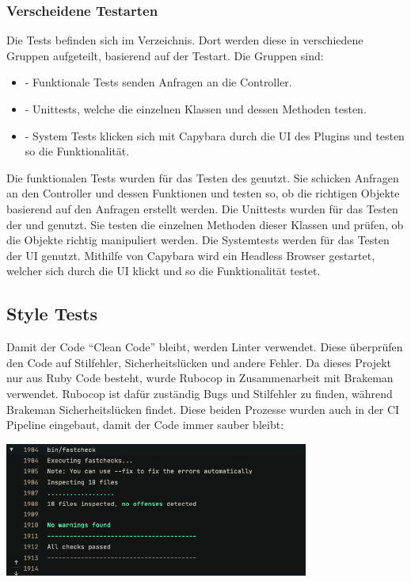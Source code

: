 \subsubsection{Verscheidene Testarten}
Die Tests befinden sich im  Verzeichnis. Dort werden diese in verschiedene
Gruppen aufgeteilt, basierend auf der Testart. Die Gruppen sind:
\begin{itemize}
    \item {} - Funktionale Tests senden Anfragen an die Controller.
    \item {} - Unittests, welche die einzelnen Klassen und dessen Methoden
    testen.
    \item {} - System Tests klicken sich mit Capybara durch die UI des
    Plugins und testen so die Funktionalität.
\end{itemize}
Die funktionalen Tests wurden für das Testen des 
genutzt. Sie schicken Anfragen an den Controller und dessen Funktionen und testen so, ob die richtigen
Objekte basierend auf den Anfragen erstellt werden. \newline
Die Unittests wurden für das Testen der  und 
 genutzt. Sie testen die einzelnen Methoden dieser Klassen und
prüfen, ob die Objekte richtig manipuliert werden. \newline
Die Systemtests werden für das Testen der UI genutzt. Mithilfe von Capybara wird ein Headless Browser
gestartet, welcher sich durch die UI klickt und so die Funktionalität testet.
\subsection{Style Tests}
Damit der Code \enquote{Clean Code} bleibt, werden Linter verwendet. Diese überprüfen den Code auf Stilfehler,
Sicherheitslücken und andere Fehler. \newline
Da dieses Projekt nur aus Ruby Code besteht, wurde Rubocop in Zusammenarbeit mit Brakeman verwendet. Rubocop
ist dafür zuständig Bugs und Stilfehler zu finden, während Brakeman Sicherheitslücken findet. Diese beiden
Prozesse wurden auch in der CI Pipeline eingebaut, damit der Code immer sauber bleibt:
\begin{center}
    \includegraphics[width=0.75\textwidth]{images/misc/stylecheck_ci.png}
    \label{fig:ci_pipeline}
\end{center}

